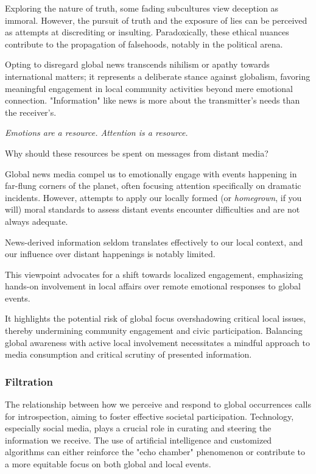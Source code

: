 \documentclass[11pt,a4]{article}
\begin{document}
    Exploring the nature of truth, some fading subcultures view deception
    as immoral. However, the pursuit of truth and the exposure of lies
    can be perceived as attempts at discrediting or insulting.
    Paradoxically, these ethical nuances contribute to the propagation
    of falsehoods, notably in the political arena.


    Opting to disregard global news transcends nihilism or apathy
    towards international matters; it represents a deliberate stance
    against globalism, favoring meaningful engagement in local community
    activities beyond mere emotional connection.    "Information" like
    news is  more about the transmitter's needs than the receiver's.

    \textit{Emotions are a resource. Attention is a resource.}

    Why should these resources be spent on messages from distant media?

    Global news media compel us to emotionally engage with events
    happening in far-flung corners of the planet, often focusing
    attention specifically on dramatic incidents. However, attempts
    to apply our locally formed (or \textit{homegrown}, if you will)
    moral standards to assess distant events encounter difficulties
    and are not always adequate.

    News-derived information seldom translates effectively to our
    local context, and our influence over distant happenings is notably limited.


    This viewpoint
    advocates for a shift towards localized engagement, emphasizing
    hands-on involvement in local affairs over remote
    emotional responses to global events.

  It highlights the potential risk of global focus overshadowing critical
    local issues, thereby undermining community engagement and civic participation.
    Balancing global awareness with active local involvement necessitates
    a mindful approach to media consumption and critical scrutiny of
    presented information.

    \subsubsection{Filtration}
    The relationship between how we perceive and respond to
    global occurrences calls for introspection, aiming to foster effective
    societal participation.   Technology, especially social media, plays a
    crucial role in curating and steering the information we receive. The
    use of artificial intelligence and customized algorithms can either
    reinforce the "echo chamber" phenomenon or contribute to a more equitable
    focus on both global and local events.
\end{document}
